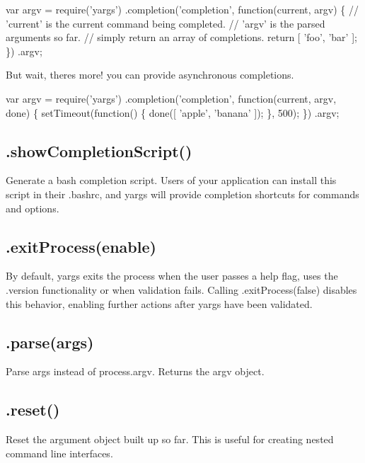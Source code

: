 \begin{DoxyCode}
var argv = require('yargs')
  .completion('completion', function(current, argv) \{
    // 'current' is the current command being completed.
    // 'argv' is the parsed arguments so far.
    // simply return an array of completions.
    return [
      'foo',
      'bar'
    ];
  \})
  .argv;
\end{DoxyCode}


But wait, there\textquotesingle{}s more! you can provide asynchronous completions.


\begin{DoxyCode}
var argv = require('yargs')
  .completion('completion', function(current, argv, done) \{
    setTimeout(function() \{
      done([
        'apple',
        'banana'
      ]);
    \}, 500);
  \})
  .argv;
\end{DoxyCode}


\subsection*{.show\+Completion\+Script() }

Generate a bash completion script. Users of your application can install this script in their {\ttfamily .bashrc}, and yargs will provide completion shortcuts for commands and options.

\subsection*{.exit\+Process(enable) }

By default, yargs exits the process when the user passes a help flag, uses the {\ttfamily .version} functionality or when validation fails. Calling {\ttfamily .exit\+Process(false)} disables this behavior, enabling further actions after yargs have been validated.

\subsection*{.parse(args) }

Parse {\ttfamily args} instead of {\ttfamily process.\+argv}. Returns the {\ttfamily argv} object.

\subsection*{.reset() }

Reset the argument object built up so far. This is useful for creating nested command line interfaces.


